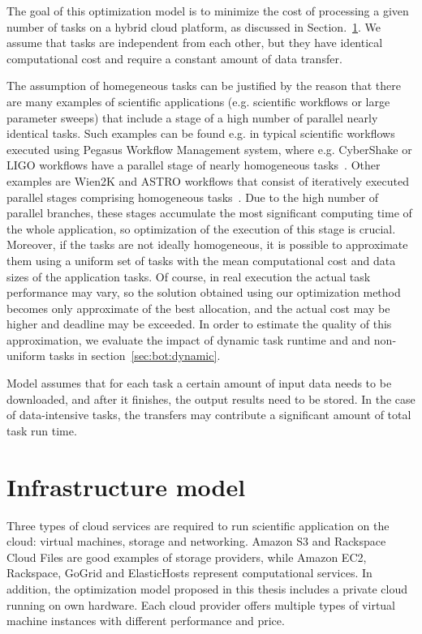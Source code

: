 {  The goal of this optimization model is to minimize the cost of processing a given number of tasks on a hybrid cloud platform, as discussed in Section.~\ref{sec:bot:cloudmodel}. We assume that tasks are independent from each other, but they have identical computational cost and require a constant amount of data transfer. 

  The assumption of homegeneous tasks can be justified by the reason that there are many examples of scientific applications (e.g. scientific workflows or large parameter sweeps) that include a stage of a high number of parallel nearly identical tasks. Such examples can be found e.g. in typical scientific workflows executed using Pegasus Workflow Management system, where e.g. CyberShake or LIGO workflows have a parallel stage of nearly homogeneous tasks~\cite{Bharathi08}. Other examples are Wien2K and ASTRO workflows that consist of iteratively executed parallel stages comprising homogeneous tasks~\cite{Duan12}. Due to the high number of parallel branches, these stages accumulate the most significant computing time of the whole application, so optimization of the execution of this stage is crucial. Moreover, if the tasks are not ideally homogeneous, it is possible to approximate them using a uniform set of tasks with the mean computational cost and data sizes of the application tasks. Of course, in real execution the actual task performance may vary, so the solution obtained using our optimization method becomes only approximate of the best allocation, and the actual cost may be higher and deadline may be exceeded. In order to estimate the quality of this approximation, we evaluate the impact of dynamic task runtime and and non-uniform tasks in section~\ref{sec:bot:dynamic}. 

  Model assumes that for each task a certain amount of input data needs to be downloaded, and after it finishes, the output results need to be stored. In the case of data-intensive tasks, the transfers may contribute a significant amount of total task run time.

\section{Infrastructure model}
\label{sec:bot:cloudmodel}

Three types of cloud services are required to run scientific application on the cloud: virtual machines, storage and networking. Amazon S3 and Rackspace Cloud Files are good examples of storage providers, while Amazon EC2, Rackspace, GoGrid and ElasticHosts represent computational services. In addition, the optimization model proposed in this thesis includes a private cloud running on own hardware. Each cloud provider offers multiple types of virtual machine instances with different performance and price.

}

